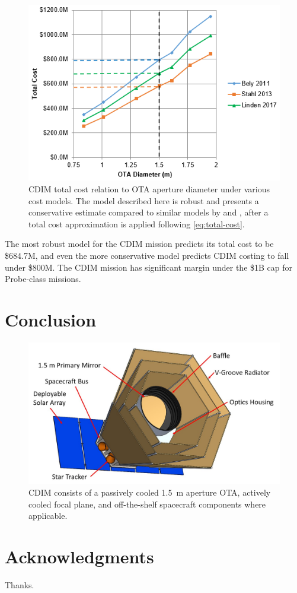 \documentclass{ws-jai}
\begin{document}
\begin{figure}
  \centering
  \includegraphics[width=.6\linewidth]{figs/total-cost-vs-diameter.png}
  \caption{CDIM total cost relation to OTA aperture diameter under various cost models. The model described here is robust and presents a conservative estimate compared to similar models by \citeauthor{bely2011} and \citeauthor{stahl2013}, after a total cost approximation is applied following \autoref{eq:total-cost}.
\label{fig:cost-total-compare-models}
}
\end{figure}

The most robust model for the CDIM mission predicts its total cost to be \$684.7M, and even the more conservative model predicts CDIM costing to fall under \$800M.
The CDIM mission has significant margin under the \$1B cap for Probe-class missions.


\section{Conclusion}
\label{sec:conclusion}
\begin{figure}
  \includegraphics[width=\linewidth]{figs/cdim_annotated-cartoon}
  \caption{CDIM consists of a passively cooled \SI{1.5}{\meter} aperture OTA, actively cooled focal plane, and off-the-shelf spacecraft components where applicable.}
\label{fig:cdim-annotated}
\end{figure}
\section*{Acknowledgments}
Thanks.


\end{document}
